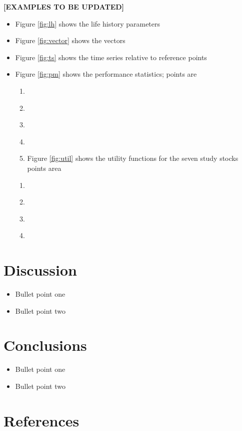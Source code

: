 \documentclass[preprint,12pt]{elsarticle}
\begin{document}
\textbf{[EXAMPLES TO BE UPDATED]}
\begin{itemize}
\item Figure \ref{fig:lh} shows the life history parameters
\item Figure \ref{fig:vector} shows the vectors
\item Figure \ref{fig:ts} shows the time series relative to reference points
\item Figure \ref{fig:pm} shows the performance statistics; points are
\begin{enumerate}
 \item ~
 \item ~
 \item ~
 \item ~\item Figure \ref{fig:util} shows the utility functions for the seven study stocks points area
\end{enumerate}
\begin{enumerate}
 \item ~
 \item ~
 \item ~
 \item ~
\end{enumerate}

\end{itemize}

\section{Discussion}


\begin{itemize}
\item Bullet point one
\item Bullet point two
\end{itemize}

\section{Conclusions}

\begin{itemize}
\item Bullet point one
\item Bullet point two
\end{itemize}

\section{References}
\end{document}
